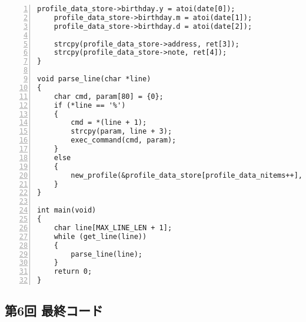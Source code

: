 \documentclass[autodetect-engine,dvi=dvipdfmx,ja=standard,
               a4j,11pt]{bxjsarticle}
\begin{document}
\begin{Verbatim}[numbers=left, xleftmargin=10mm, numbersep=6pt,
    fontsize=\small, baselinestretch=0.8]
    profile_data_store->birthday.y = atoi(date[0]);
    profile_data_store->birthday.m = atoi(date[1]);
    profile_data_store->birthday.d = atoi(date[2]);

    strcpy(profile_data_store->address, ret[3]);
    strcpy(profile_data_store->note, ret[4]);
}

void parse_line(char *line)
{
    char cmd, param[80] = {0};
    if (*line == '%')
    {
        cmd = *(line + 1);
        strcpy(param, line + 3);
        exec_command(cmd, param);
    }
    else
    {
        new_profile(&profile_data_store[profile_data_nitems++], line);
    }
}

int main(void)
{
    char line[MAX_LINE_LEN + 1];
    while (get_line(line))
    {
        parse_line(line);
    }
    return 0;
}

\end{Verbatim}

\subsection{第6回 最終コード} \label{code:6}
\end{document}
